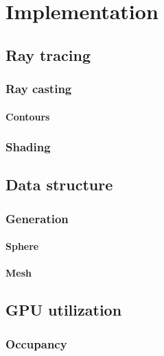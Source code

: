 \chapter{Implementation}
\label{implementation}

\section{Ray tracing}

\subsection{Ray casting}

\subsubsection{Contours}

\subsection{Shading}

\section{Data structure}

\subsection{Generation}

\subsubsection{Sphere}

\subsubsection{Mesh}

\section{GPU utilization}

\subsection{Occupancy}
